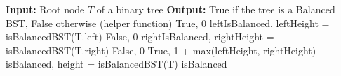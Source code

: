 \documentclass[10pt]{article}
\begin{document}
\begin{solution}
\begin{enumerate}[(a)]
\begin{algorithm}
            \begin{algorithmic}[1]
            \Statex \textbf{Input:} Root node $T$ of a binary tree
            \Statex \textbf{Output:} True if the tree is a Balanced BST, False otherwise
             (helper function)
                    \State \Return True, 0
                \EndIf
                \State  leftIsBalanced, leftHeight = isBalancedBST(T.left)
                    \State \Return False, 0
                \EndIf
                \State rightIsBalanced, rightHeight = isBalancedBST(T.right)
                    \State \Return False, 0
                \EndIf
                \State \Return True, 1 + max(leftHeight, rightHeight)
            \EndFunction
                \State isBalanced, height = isBalancedBST(T)
                \State \Return isBalanced
            \EndFunction
            \end{algorithmic}
        \end{algorithm}
    \end{enumerate}
\end{solution}
\end{document}
